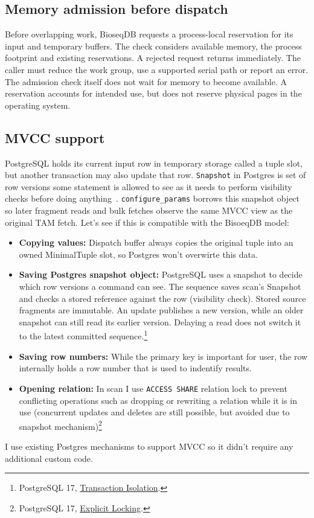 \subsection{Memory admission before dispatch}
\label{sec:dispatch-memory-admission}

Before overlapping work, BioseqDB requests a process-local reservation for
its input and temporary buffers. The check considers available memory,
the process footprint and existing reservations. A rejected request returns
immediately. The caller must reduce the work group, use a supported serial
path or report an error. The admission check itself does not wait for memory
to become available. A reservation accounts for intended use, but does not
reserve physical pages in the operating system.

\subsection{MVCC support}
\label{sec:scan-row-stability}

PostgreSQL holds its current input row in temporary storage called a tuple
slot, but another transaction may also update that row. \texttt{Snapshot} in Postgres is set of row versions some statement is allowed to see as it needs to perform visibility checks before doing anything~\parencite{postgresql17_mvcc}.
\texttt{configure\_params} borrows this snapshot object so later fragment reads and bulk fetches observe the same MVCC view as the original TAM fetch.
Let's see if this is compatible with the BisoeqDB model:

\begin{itemize}
  \item \textbf{Copying values:} Dispatch buffer always copies the original tuple into an owned MinimalTuple slot, so Postgres won't overwirte this data.
  \item \textbf{Saving Postgres snapshot object:} PostgreSQL uses a snapshot to
    decide which row versions a command can see. The sequence saves scan's Snapshot and checks a stored reference against the row (visibility check). Stored source fragments
    are immutable. An update publishes a new version, while an
    older snapshot can still read its earlier version. Delaying a read does
    not switch it to the latest committed sequence.\footnote{PostgreSQL 17,
    \href{https://www.postgresql.org/docs/17/transaction-iso.html}
    {Transaction Isolation}.}
  \item \textbf{Saving row numbers:} While the primary key is important for user, the row internally holds a row number that is used to indentify results.
  \item \textbf{Opening relation:} In scan I use 
    \texttt{ACCESS SHARE} relation lock to prevent conflicting operations such as dropping or
    rewriting a relation while it is in use (concurrent updates and deletes are still possible, but avoided due to snapshot mechanism)\footnote{PostgreSQL 17,
    \href{https://www.postgresql.org/docs/17/explicit-locking.html}
    {Explicit Locking}.}
\end{itemize}
I use existing Postgres mechanisms to support MVCC so it didn't require any additional custom code.

